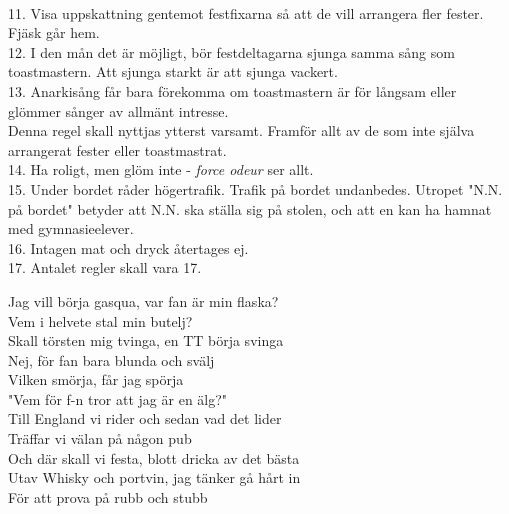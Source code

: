 \documentclass[a6paper, 10pt, twoside]{article}
\begin{document}
\vspace{5pt} \\
11. Visa uppskattning gentemot festfixarna så att de vill arrangera fler fester. Fjäsk går hem.
\vspace{5pt} \\
12. I den mån det är möjligt, bör festdeltagarna sjunga samma sång som toastmastern. Att sjunga starkt är att sjunga vackert.
\vspace{5pt} \\
13. Anarkisång får bara förekomma om toastmastern är för långsam eller glömmer sånger av allmänt intresse.\\ Denna regel skall nyttjas ytterst varsamt. Framför allt av de som inte själva arrangerat fester eller toastmastrat.
\vspace{5pt} \\
14. Ha roligt, men glöm inte - \textit{force odeur} ser allt.
\vspace{5pt} \\
15. Under bordet råder högertrafik. Trafik på bordet undanbedes. Utropet "N.N. på bordet" betyder att N.N. ska ställa sig på stolen, och att en kan ha hamnat med gymnasieelever.
\vspace{5pt} \\
16. Intagen mat och dryck återtages ej.
\vspace{5pt} \\
17. Antalet regler skall vara 17.

\noindent
{}
\small
\begin{center}
\end{center}
\begin{lyrics}
Jag vill börja gasqua, var fan är min flaska?\\
Vem i helvete stal min butelj?\\
Skall törsten mig tvinga, en TT börja svinga\\
Nej, för fan bara blunda och svälj\\
Vilken smörja, får jag spörja\\
"Vem för f-n tror att jag är en älg?"\\
 \newline
Till England vi rider och sedan vad det lider\\
Träffar vi välan på någon pub\\
Och där skall vi festa, blott dricka av det bästa\\
Utav Whisky och portvin, jag tänker gå hårt in\\
För att prova på rubb och stubb
\end{lyrics}
%
\end{document}
